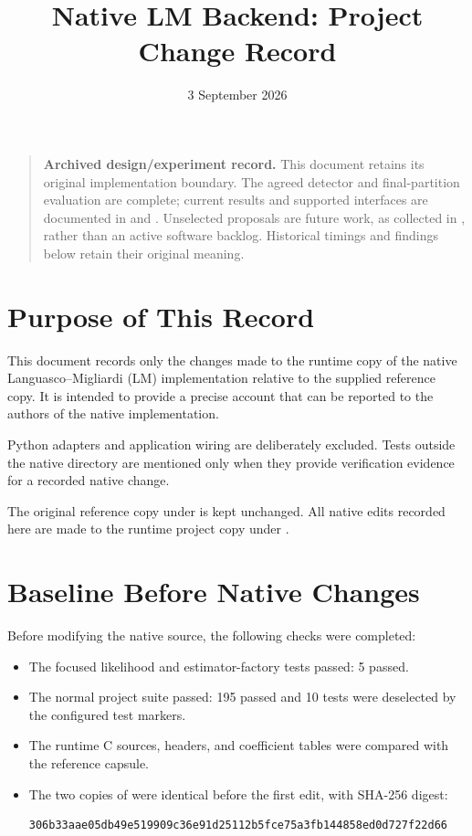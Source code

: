 \documentclass[11pt,a4paper]{article}
\title{Native LM Backend: Project Change Record}
\date{3 September 2026}
\begin{document}
\maketitle

\begin{quote}
\textbf{Archived design/experiment record.} This document retains its original
implementation boundary. The agreed detector and final-partition evaluation
are complete; current results and supported interfaces are documented in
 and
. Unselected proposals are future
work, as collected in , rather than an active software
backlog. Historical timings and findings below retain their original meaning.
\end{quote}


\section{Purpose of This Record}

This document records only the changes made to the runtime copy of the native
Languasco--Migliardi (LM) implementation relative to the supplied reference
copy. It is intended to provide a precise account that can be reported to the
authors of the native implementation.

Python adapters and application wiring are deliberately excluded. Tests outside
the native directory are mentioned only when they provide verification evidence
for a recorded native change.

The original reference copy under  is kept unchanged.
All native edits recorded here are made to the runtime project copy under
.

\section{Baseline Before Native Changes}

Before modifying the native source, the following checks were completed:

\begin{itemize}

\item The focused likelihood and estimator-factory tests passed: 5 passed.

\item The normal project suite passed: 195 passed and 10 tests were deselected
by the configured test markers.

\item The runtime C sources, headers, and coefficient tables were compared with
the reference capsule.

\item The two copies of  were identical before the first
edit, with SHA-256 digest:

\begin{verbatim}
306b33aae05db49e519909c36e91d25112b5fce75a3fb144858ed0d727f22d66
\end{verbatim}

\end{itemize}
\end{document}
